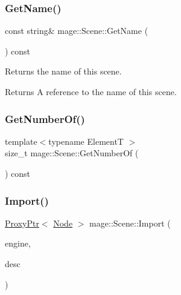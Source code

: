 \mbox{\label{classmage_1_1_scene_a6afd25c30d08eb579eb430af49cf8fc0}} 
\subsubsection{\texorpdfstring{Get\+Name()}{GetName()}}
{\footnotesize\ttfamily const string\& mage\+::\+Scene\+::\+Get\+Name (\begin{DoxyParamCaption}{ }\end{DoxyParamCaption}) const\hspace{0.3cm}{\ttfamily [noexcept]}}

Returns the name of this scene.

\begin{DoxyReturn}{Returns}
A reference to the name of this scene. 
\end{DoxyReturn}
\mbox{\label{classmage_1_1_scene_a308480749d009dad3a39333fd0c59f2a}} 
\subsubsection{\texorpdfstring{Get\+Number\+Of()}{GetNumberOf()}}
{\footnotesize\ttfamily template$<$typename ElementT $>$ \\
size\+\_\+t mage\+::\+Scene\+::\+Get\+Number\+Of (\begin{DoxyParamCaption}{ }\end{DoxyParamCaption}) const\hspace{0.3cm}{\ttfamily [noexcept]}}

\mbox{\label{classmage_1_1_scene_a03490fe422fdfa110a6d3b58c31d1bb4}} 
\subsubsection{\texorpdfstring{Import()}{Import()}\hspace{0.1cm}{\footnotesize\ttfamily [1/2]}}
{\footnotesize\ttfamily \mbox{\hyperlink{classmage_1_1_proxy_ptr}{Proxy\+Ptr}}$<$ \mbox{\hyperlink{classmage_1_1_node}{Node}} $>$ mage\+::\+Scene\+::\+Import (\begin{DoxyParamCaption}\item[{\mbox{\hyperlink{classmage_1_1_engine}{Engine}} \&}]{engine,  }\item[{const \mbox{\hyperlink{classmage_1_1rendering_1_1_model_descriptor}{rendering\+::\+Model\+Descriptor}} \&}]{desc }\end{DoxyParamCaption})}

